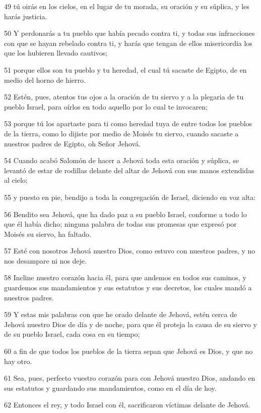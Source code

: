 \par 49 tú oirás en los cielos, en el lugar de tu morada, su oración y su súplica, y les harás justicia.
\par 50 Y perdonarás a tu pueblo que había pecado contra ti, y todas sus infracciones con que se hayan rebelado contra ti, y harás que tengan de ellos misericordia los que los hubieren llevado cautivos;
\par 51 porque ellos son tu pueblo y tu heredad, el cual tú sacaste de Egipto, de en medio del horno de hierro.
\par 52 Estén, pues, atentos tus ojos a la oración de tu siervo y a la plegaria de tu pueblo Israel, para oírlos en todo aquello por lo cual te invocaren;
\par 53 porque tú los apartaste para ti como heredad tuya de entre todos los pueblos de la tierra, como lo dijiste por medio de Moisés tu siervo, cuando sacaste a nuestros padres de Egipto, oh Señor Jehová.
\par 54 Cuando acabó Salomón de hacer a Jehová toda esta oración y súplica, se levantó de estar de rodillas delante del altar de Jehová con sus manos extendidas al cielo;
\par 55 y puesto en pie, bendijo a toda la congregación de Israel, diciendo en voz alta:
\par 56 Bendito sea Jehová, que ha dado paz a su pueblo Israel, conforme a todo lo que él había dicho; ninguna palabra de todas sus promesas que expresó por Moisés su siervo, ha faltado. 
\par 57 Esté con nosotros Jehová nuestro Dios, como estuvo con nuestros padres, y no nos desampare ni nos deje.
\par 58 Incline nuestro corazón hacia él, para que andemos en todos sus caminos, y guardemos sus mandamientos y sus estatutos y sus decretos, los cuales mandó a nuestros padres.
\par 59 Y estas mis palabras con que he orado delante de Jehová, estén cerca de Jehová nuestro Dios de día y de noche, para que él proteja la causa de su siervo y de su pueblo Israel, cada cosa en su tiempo;
\par 60 a fin de que todos los pueblos de la tierra sepan que Jehová es Dios, y que no hay otro.
\par 61 Sea, pues, perfecto vuestro corazón para con Jehová nuestro Dios, andando en sus estatutos y guardando sus mandamientos, como en el día de hoy.
\par 62 Entonces el rey, y todo Israel con él, sacrificaron víctimas delante de Jehová.
